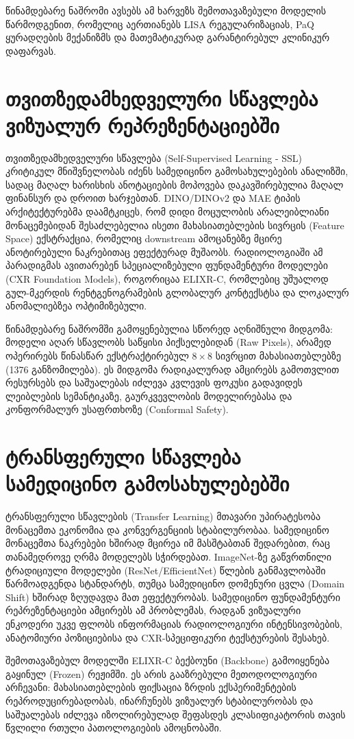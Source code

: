 \documentclass[12pt,a4paper,oneside]{report}
\begin{document}
წინამდებარე ნაშრომი ავსებს ამ ხარვეზს შემოთავაზებული მოდელის წარმოდგენით, რომელიც აერთიანებს LISA რეგულარიზაციას, PaQ ყურადღების მექანიზმს და მათემატიკურად გარანტირებულ კლინიკურ დაფარვას.

\section{თვითზედამხედველური სწავლება ვიზუალურ რეპრეზენტაციებში}
თვითზედამხედველური სწავლება (Self-Supervised Learning - SSL) კრიტიკულ მნიშვნელობას იძენს სამედიცინო გამოსახულებების ანალიზში, სადაც მაღალ ხარისხის ანოტაციების მოპოვება დაკავშირებულია მაღალ ფინანსურ და დროით ხარჯებთან. DINO/DINOv2 და MAE ტიპის არქიტექტურებმა დაამტკიცეს, რომ დიდი მოცულობის არალეიბლიანი მონაცემებიდან შესაძლებელია ისეთი მახასიათებლების სივრცის (Feature Space) ექსტრაქცია, რომელიც downstream ამოცანებზე მცირე ანოტირებული ნაკრებითაც ეფექტურად მუშაობს. რადიოლოგიაში ამ პარადიგმას ავითარებენ სპეციალიზებული ფუნდამენტური მოდელები (CXR Foundation Models), როგორიცაა ELIXR-C, რომლებიც უშუალოდ გულ-მკერდის რენტგენოგრამების გლობალურ კონტექსტსა და ლოკალურ ანომალიებზეა ოპტიმიზებული.

წინამდებარე ნაშრომში გამოყენებულია სწორედ აღნიშნული მიდგომა: მოდელი აღარ სწავლობს საწყისი პიქსელებიდან (Raw Pixels), არამედ ოპერირებს წინასწარ ექსტრაქტირებულ $8 \times 8$ სივრცით მახასიათებლებზე (1376 განზომილება). ეს მიდგომა რადიკალურად ამცირებს გამოთვლით რესურსებს და საშუალებას იძლევა კვლევის ფოკუსი გადავიდეს ლეიბლების სემანტიკაზე, გაურკვევლობის მოდელირებასა და კონფორმალურ უსაფრთხოზე (Conformal Safety).

\section{ტრანსფერული სწავლება სამედიცინო გამოსახულებებში}
ტრანსფერული სწავლების (Transfer Learning) მთავარი უპირატესობა მონაცემთა ეკონომია და კონვერგენციის სტაბილურობაა. სამედიცინო მონაცემთა ნაკრებები ხშირად მცირეა იმ მასშტაბთან შედარებით, რაც თანამედროვე ღრმა მოდელებს სჭირდებათ. ImageNet-ზე გაწვრთნილი ტრადიციული მოდელები (ResNet/EfficientNet) წლების განმავლობაში წარმოადგენდა სტანდარტს, თუმცა სამედიცინო დომენური ცვლა (Domain Shift) ხშირად ზღუდავდა მათ ეფექტურობას. სამედიცინო ფუნდამენტური რეპრეზენტაციები ამცირებს ამ პრობლემას, რადგან ვიზუალური ენკოდერი უკვე ფლობს ინფორმაციას რადიოლოგიური ინტენსივობების, ანატომიური პოზიციებისა და CXR-სპეციფიკური ტექსტურების შესახებ.

შემოთავაზებულ მოდელში ELIXR-C ბექბოუნი (Backbone) გამოიყენება გაყინულ (Frozen) რეჟიმში. ეს არის გააზრებული მეთოდოლოგიური არჩევანი: მახასიათებლების ფიქსაცია ზრდის ექსპერიმენტების რეპროდუცირებადობას, ინარჩუნებს ვიზუალურ სტაბილურობას და საშუალებას იძლევა იზოლირებულად შეფასდეს კლასიფიკატორის თავის წვლილი რთული პათოლოგიების ამოცნობაში.
\end{document}

